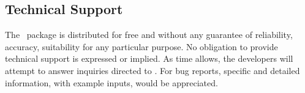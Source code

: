 \subsection{Technical Support}
The \PSIthree\ package is distributed for free and without any guarantee
of reliability, accuracy, suitability for any particular purpose.  
No obligation to provide technical support is expressed or implied.  
As time allows, the developers will attempt to answer inquiries directed
to 
.
For bug reports, specific and detailed information, with example inputs,
would be appreciated.



